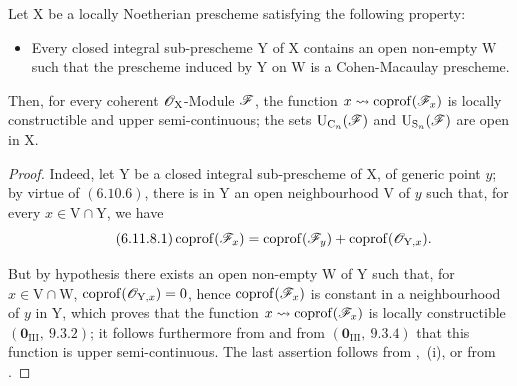 
\begin{proposition}[6.11.8]
\label{IV.6.11.8}
Let $\mathrm{X}$ be a locally Noetherian prescheme satisfying the following property:
\begin{itemize}
  \item[\textnormal{(CMU)}] Every closed integral sub-prescheme $\mathrm{Y}$ of $\mathrm{X}$ contains an open non-empty $\mathrm{W}$ such that the prescheme induced by $\mathrm{Y}$ on $\mathrm{W}$
is a Cohen-Macaulay prescheme.
\end{itemize}
Then, for every coherent $\mathscr{O}_\mathrm{X}$-Module $\mathscr{F}$, the function $x\leadsto\operatorname{coprof}(\mathscr{F}_x)$ is locally constructible and upper
semi-continuous; the sets $\mathrm{U}_{\mathrm{C}_n}(\mathscr{F})$ and $\mathrm{U}_{\mathrm{S}_n}(\mathscr{F})$ are open in $\mathrm{X}$.
\end{proposition}

\begin{proof}
Indeed, let $\mathrm{Y}$ be a closed integral sub-prescheme of $\mathrm{X}$, of generic point $y$; by virtue of $(6.10.6)$, there is in $\mathrm{Y}$ an open
neighbourhood $\mathrm{V}$ of $y$ such that, for every $x\in\mathrm{V}\cap\mathrm{Y}$, we have
\begin{equation}
\tag{6.11.8.1}
\label{IV.6.11.8.1}
  \operatorname{coprof}(\mathscr{F}_x)=\operatorname{coprof}(\mathscr{F}_y)+\operatorname{coprof}(\mathscr{O}_{\mathrm{Y},x}).
\end{equation}

But by hypothesis there exists an open non-empty $\mathrm{W}$ of $\mathrm{Y}$ such that, for $x\in\mathrm{V}\cap\mathrm{W}$, $\operatorname{coprof}(\mathscr{O}_{\mathrm{Y},x})=0$,
hence $\operatorname{coprof}(\mathscr{F}_x)$ is constant in a neighbourhood of $y$ in $\mathrm{Y}$, which proves that the function
$x\leadsto\operatorname{coprof}(\mathscr{F}_x)$ is
locally constructible $(\mathbf{0}_{\mathrm{III}},~9.3.2)$; it follows furthermore from  and from $(\mathbf{0}_{\mathrm{III}},~9.3.4)$ that this function
is upper semi-continuous. The last assertion follows from ,~(i), or from .
\end{proof}


